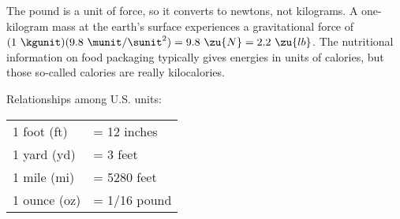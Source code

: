  \noindent{}The pound is a unit of force, so it converts to newtons, not kilograms.
 A one-kilogram mass at the earth's surface experiences a gravitational force of
 $(1\ \kgunit)(9.8\ \munit/\sunit^2)=9.8\ \zu{N}=2.2\ \zu{lb}$. The nutritional
 information on food packaging
 typically gives energies in units of calories, but those so-called calories are
 really kilocalories.

 \noindent Relationships among U.S. units:\\
 \noindent\begin{tabular}{|l|l|}
 \hline
 1 foot (ft)	&= 12 inches\\
 1 yard (yd) &= 3 feet \\
 1 mile (mi) &= 5280 feet\\
 1 ounce (oz) &= 1/16 pound\\
 \hline
\end{tabular}

 \raggedbottom
